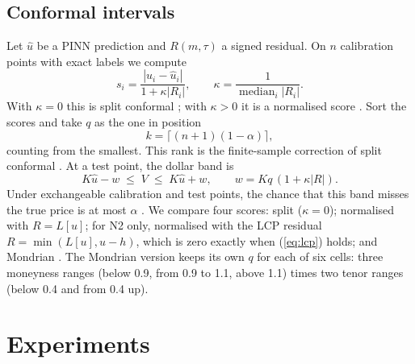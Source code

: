 \documentclass[conference]{IEEEtran}
\DeclareMathOperator*{\median}{median}
\begin{document}
\subsection{Conformal intervals}
Let $\hat u$ be a PINN prediction and $R(m,\tau)$ a signed residual. On $n$ calibration points with exact labels we compute
\begin{equation}
s_i=\frac{|u_i-\hat u_i|}{1+\kappa|R_i|},\qquad \kappa=\frac{1}{\median_i|R_i|}. \label{eq:score}
\end{equation}
With $\kappa=0$ this is split conformal \cite{papadopoulos2002inductive}; with $\kappa>0$ it is a normalised score \cite{papadopoulos2011regression}. Sort the scores and take $q$ as the one in position
\begin{equation}
k=\lceil (n+1)(1-\alpha)\rceil , \label{eq:k}
\end{equation}
counting from the smallest. This rank is the finite-sample correction of split conformal \cite{lei2018distribution}. At a test point, the dollar band is
\begin{equation}
K\hat u-w\;\le\;V\;\le\;K\hat u+w,\qquad w=Kq\,(1+\kappa|R|). \label{eq:band}
\end{equation}
Under exchangeable calibration and test points, the chance that this band misses the true price is at most $\alpha$ \cite{lei2018distribution}. We compare four scores: split ($\kappa=0$); normalised with $R=L[u]$; for N2 only, normalised with the LCP residual $R=\min(L[u],u-h)$, which is zero exactly when (\ref{eq:lcp}) holds; and Mondrian \cite{bostrom2020mondrian}. The Mondrian version keeps its own $q$ for each of six cells: three moneyness ranges (below 0.9, from 0.9 to 1.1, above 1.1) times two tenor ranges (below 0.4 and from 0.4 up).

\section{Experiments}
\end{document}

